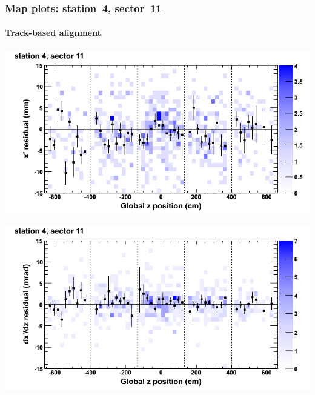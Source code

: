 \documentclass[compress]{beamer}
\begin{document}
\begin{frame}
\frametitle{Map plots: station~4, sector~11}
\framesubtitle{Track-based alignment}
\includegraphics[width=0.5\linewidth]{mapplots_re05/DTvsz_st4sec11_x.png}

\includegraphics[width=0.5\linewidth]{mapplots_re05/DTvsz_st4sec11_dxdz.png}
\end{frame}
\end{document}
